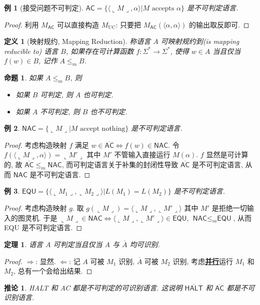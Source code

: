 \documentclass[8pt]{article}
\theoremstyle{compact}
\newtheorem{theorem}{定理}[section]
\newtheorem{definition}{定义}[section]
\newtheorem{proposition}{命题}[section]
\newtheorem{corollary}{推论}[section]
\newtheorem{example}{例}[section]
\def\obj#1{\textbf{\uline{#1}}}
\def\le{\leqslant}
\def\rep#1{\llcorner{#1}\lrcorner}
\begin{document}
\begin{example}[接受问题不可判定]
	$\textsf{AC} = \{\langle \rep M, \alpha \rangle | M \text{ accepts } \alpha\}$ 是不可判定语言.	
\end{example}
\begin{proof}
	利用 $M_{\textsf{AC}}$ 可以直接构造 $M_{\text{UC}}$: 只要把 $M_{\textsf{AC}}(\langle \alpha, \alpha \rangle)$ 的输出取反即可.
\end{proof}
\begin{definition}[映射规约, Mapping Reduction]
	称语言 $A$ 可映射规约到(is mapping reducible to) 语言 $B$, 如果存在可计算函数 $f: \Sigma^* \to \Sigma^*$, 使得 $w \in A$ 当且仅当 $f(w) \in B$, 记作 $A \le_m B$.
\end{definition}
\begin{proposition} 如果 $A \le_m B$, 则
	\begin{itemize}
		\item 如果 $B$ 可判定, 则 $A$ 也可判定.
		\item 如果 $A$ 不可判定, 则 $B$ 也不可判定.
	\end{itemize}
\end{proposition}
\begin{example}
	$\textsf{NAC} = \{\rep M | M \text{ accept nothing}\}$ 是不可判定语言.
\end{example}
\begin{proof}
	考虑构造映射 $f$ 满足 $w \in \overline{\textsf{AC}} \Leftrightarrow f(w) \in \textsf{NAC}$. 令 $f(\langle \rep M, \alpha \rangle) = \rep{M'}$ 其中 $M'$ 不管输入直接运行 $M(\alpha)$. $f$ 显然是可计算的, 故 $\overline{\textsf{AC}} \le_m \textsf{NAC}$, 而可判定语言关于补集的封闭性导致 $\overline{\textsf{AC}}$ 是不可判定语言, 从而 $\textsf{NAC}$ 是不可判定语言.
\end{proof}
\begin{example}
	$\textsf{EQU} = \{\langle \rep{M_1}, \rep{M_2} \rangle | L(M_1) = L(M_2)\}$ 是不可判定语言.
\end{example}
\begin{proof}
	考虑构造映射 $g$. 取 $g(\rep{M}) = \langle \rep{M}, \rep{M'}\rangle$ 其中 $M'$ 是拒绝一切输入的图灵机. 于是 $\rep{M} \in \textsf{NAC} \Leftrightarrow \langle \rep{M}, \rep{M'}\rangle \in \textsf{EQU}$, $\textsf{NAC} \le_m \textsf{EQU}$, 从而 \textsf{EQU} 是不可判定语言.
\end{proof}
\begin{theorem}
	语言 $A$ 可判定当且仅当 $A$ 与 $\overline{A}$ 均可识别.
\end{theorem}
\begin{proof}
	$\Rightarrow$: 显然. $\Leftarrow$: 记 $A$ 可被 $M_1$ 识别, $\overline A$ 可被 $M_2$ 识别, 考虑\obj{并行}运行 $M_1$ 和 $M_2$, 总有一个会给出结果. 
\end{proof}
\begin{corollary}
	\textsf{HALT} 和 \textsf{AC} 都是不可判定的可识别语言. 这说明 $\overline{\textsf{HALT}}$ 和 $\overline{\textsf{AC}}$ 都是不可识别语言.
\end{corollary}
\end{document}
